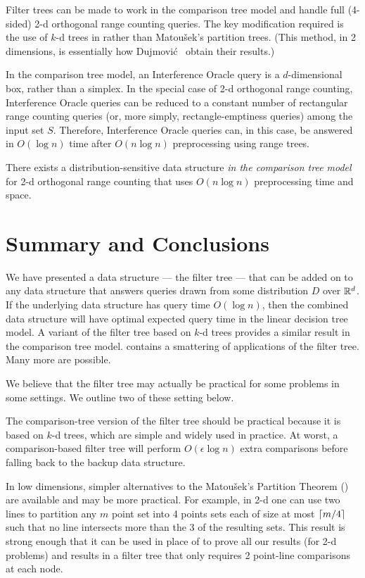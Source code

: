 \documentclass{patmorin}
\begin{document}
Filter trees can be made to work in the comparison tree model
and handle full (4-sided) 2-d orthogonal range counting queries.
The key modification required is the use of $k$-d trees in
 rather than Matou\v{s}ek's partition
trees. (This method, in 2 dimensions, is essentially how Dujmovi\'c \etal\
obtain their results.)

In the comparison tree model, an Interference Oracle query is a
$d$-dimensional box, rather than a simplex. In the special case of
2-d orthogonal range counting, Interference Oracle queries can be
reduced to a constant number of rectangular range counting queries
(or, more simply, rectangle-emptiness queries) among the input set $S$.
Therefore, Interference Oracle queries can, in this case, be answered in
$O(\log n)$ time after $O(n\log n)$ preprocessing using range trees.

\begin{thm}
  There exists a distribution-sensitive data structure \emph{in the
  comparison tree model} for 2-d orthogonal range counting that uses
  $O(n\log n)$ preprocessing time and space.
\end{thm}

\section{Summary and Conclusions}

We have presented a data structure --- the filter tree --- that can
be added on to any data structure that answers queries drawn from some
distribution $D$ over $\mathbb{R}^d$.  If the underlying data structure has query
time $O(\log n)$, then the combined data structure will have optimal
expected query time in the linear decision tree model.  A variant of
the filter tree based on $k$-d trees provides a similar result in the
comparison tree model.  \secref{applications} contains a smattering of
applications of the filter tree.  Many more are possible.

We believe that the filter tree may actually be practical for some
problems in some settings.  We outline two of these setting below.

The comparison-tree version of the filter tree should be practical
because it is based on $k$-d trees, which are simple and widely used
in practice. At worst, a comparison-based filter tree will perform
$O(\epsilon\log n)$ extra comparisons before falling back to the backup
data structure.

In low dimensions, simpler alternatives to the Matou\v{s}ek's Partition
Theorem (\thmref{point-partition}) are available and may be more
practical.  For example, in 2-d one can use two lines to partition any $m$
point set into 4 points sets each of size at most ${\left\lceil m/4 \right\rceil}$ such that
no line intersects more than the 3 of the resulting sets. This result is
strong enough that it can be used in place of \thmref{point-partition}
to prove all our results (for 2-d problems) and results in a filter tree
that only requires 2 point-line comparisons at each node.
\end{document}
